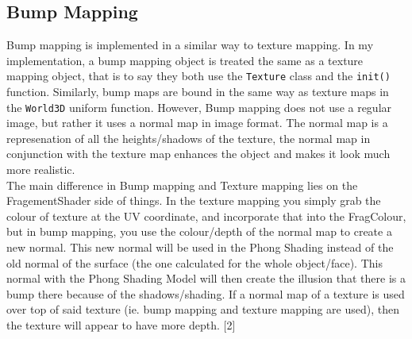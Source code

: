 \documentclass {article}
\begin{document}
\subsection{Bump Mapping}
Bump mapping is implemented in a similar way to texture mapping. In my implementation, a bump mapping object is treated the same as a texture mapping object, that is to say they both use the \texttt{Texture} class and the \texttt{init()} function. Similarly, bump maps are bound in the same way as texture maps in the \texttt{World3D} uniform function. However,  Bump mapping does not use a regular image, but rather it uses a normal map in image format. The normal map is a represenation of all the heights/shadows of the texture, the normal map in conjunction with the texture map enhances the object and makes it look much more realistic.\\ \newline
The main difference in Bump mapping and Texture mapping lies on the FragementShader side of things. In the texture mapping you simply grab the colour of texture at the UV coordinate, and incorporate that into the FragColour, but in bump mapping, you use the colour/depth of the normal map to create a new normal. This new normal will be used in the Phong Shading instead of the old normal of the surface (the one calculated for the whole object/face). This normal with the Phong Shading Model will then create the illusion that there is a bump there because of the shadows/shading. If a normal map of a texture is used over top of said texture (ie. bump mapping and texture mapping are used), then the texture will appear to have more depth. [2]
\end{document}
